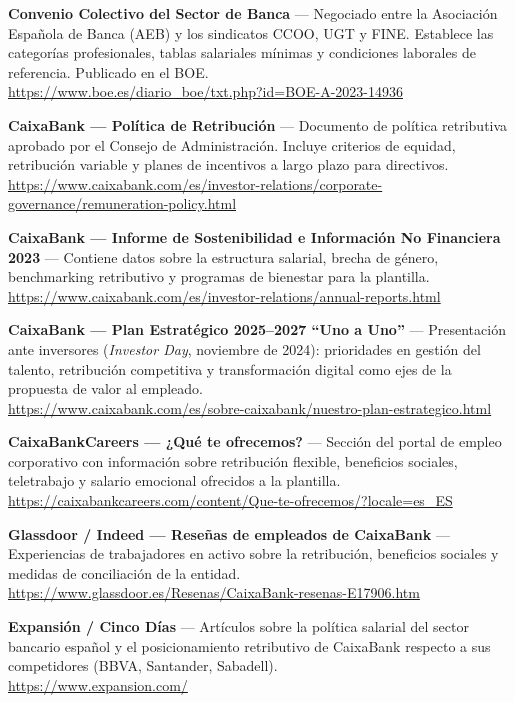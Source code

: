 \begin{enumerate}[label={[\arabic*]}, resume]

  \item \textbf{Convenio Colectivo del Sector de Banca} --- Negociado entre la Asociación Española de Banca (AEB) y los sindicatos CCOO, UGT y FINE. Establece las categorías profesionales, tablas salariales mínimas y condiciones laborales de referencia. Publicado en el BOE\@.\\
        \url{https://www.boe.es/diario_boe/txt.php?id=BOE-A-2023-14936} %

  \item \textbf{CaixaBank --- Política de Retribución} --- Documento de política retributiva aprobado por el Consejo de Administración. Incluye criterios de equidad, retribución variable y planes de incentivos a largo plazo para directivos.\\
        \url{https://www.caixabank.com/es/investor-relations/corporate-governance/remuneration-policy.html}

  \item \textbf{CaixaBank --- Informe de Sostenibilidad e Información No Financiera 2023} --- Contiene datos sobre la estructura salarial, brecha de género, benchmarking retributivo y programas de bienestar para la plantilla.\\
        \url{https://www.caixabank.com/es/investor-relations/annual-reports.html}

  \item \textbf{CaixaBank --- Plan Estratégico 2025--2027 ``Uno a Uno''} --- Presentación ante inversores (\textit{Investor Day}, noviembre de 2024): prioridades en gestión del talento, retribución competitiva y transformación digital como ejes de la propuesta de valor al empleado.\\
        \url{https://www.caixabank.com/es/sobre-caixabank/nuestro-plan-estrategico.html}

  \item \textbf{CaixaBankCareers --- ¿Qué te ofrecemos?} --- Sección del portal de empleo corporativo con información sobre retribución flexible, beneficios sociales, teletrabajo y salario emocional ofrecidos a la plantilla.\\
        \url{https://caixabankcareers.com/content/Que-te-ofrecemos/?locale=es_ES}

  \item \textbf{Glassdoor / Indeed --- Reseñas de empleados de CaixaBank} --- Experiencias de trabajadores en activo sobre la retribución, beneficios sociales y medidas de conciliación de la entidad.\\
        \url{https://www.glassdoor.es/Resenas/CaixaBank-resenas-E17906.htm}

  \item \textbf{Expansión / Cinco Días} --- Artículos sobre la política salarial del sector bancario español y el posicionamiento retributivo de CaixaBank respecto a sus competidores (BBVA, Santander, Sabadell).\\
        \url{https://www.expansion.com/}

\end{enumerate}

